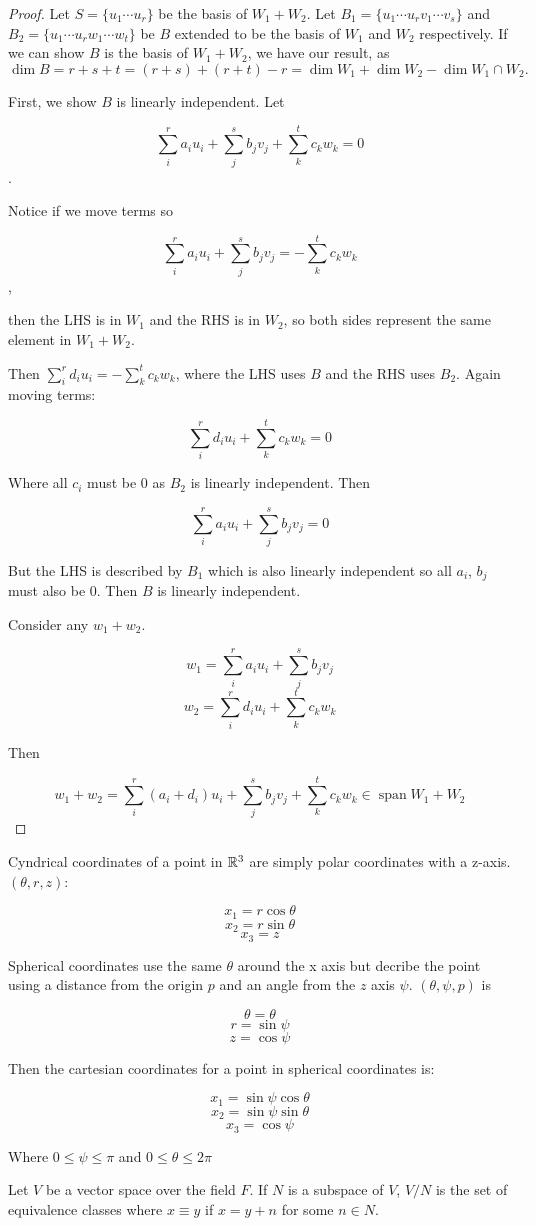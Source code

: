 \documentclass[10pt]{article}
\begin{document}
\begin{proof}
	Let $S = \{ u_1 \cdots u_r \}$ be the basis of $W_1 + W_2$. Let $B_1 = \{ u_1 \cdots u_r v_1 \cdots v_s \}$ and $B_2 = \{ u_1 \cdots u_r w_1 \cdots w_t \}$ be $B$ extended to be the basis of $W_1$ and $W_2$ respectively. 
	If we can show $B$ is the basis of $W_1 + W_2$, we have our result, as $\dim B = r + s + t = (r + s) + (r + t) - r = \dim W_1 + \dim W_2 - \dim W_1 \cap W_2.$

	First, we show $B$ is linearly independent. Let 

	\[\sum_i^r{a_iu_i} + \sum_j^s{b_jv_j} + \sum_k^t{c_kw_k} = 0\]. 

	Notice if we move terms so 

	\[\sum_i^r{a_iu_i} + \sum_j^s{b_jv_j} = -\sum_k^t{c_kw_k}\], 

	then the LHS is in $W_1$ and the RHS is in $W_2$, so both sides represent the same element in $W_1 + W_2$. 

	Then $\sum_i^r{d_iu_i} = -\sum_k^t{c_kw_k}$, where the LHS uses $B$ and the RHS uses $B_2$. Again moving terms:

	\[\sum_i^r{d_iu_i} + \sum_k^t{c_kw_k} = 0\]

	Where all $c_i$ must be 0 as $B_2$ is linearly independent. Then

	\[\sum_i^r{a_iu_i} + \sum_j^s{b_jv_j} = 0\]

	But the LHS is described by $B_1$ which is also linearly independent so all $a_i$, $b_j$ must also be 0. Then $B$ is linearly independent.

	Consider any $w_1 + w_2$. 

	\[w_1 = \sum_i^r{a_iu_i} + \sum_j^s{b_jv_j}\]
	\[w_2 = \sum_i^r{d_iu_i} + \sum_k^t{c_kw_k}\]

	Then

	\[w_1 + w_2 = \sum_i^r{(a_i + d_i) u_i} + \sum_j^s{b_jv_j} + \sum_k^t{c_kw_k} \in \operatorname{span} W_1 + W_2 \]

\end{proof}

\begin{note}

	Cyndrical coordinates of a point in $\mathbb{R}^3$ are simply polar coordinates with
	a z-axis. $(\theta, r, z)$:

	\[ x_1 = r \cos \theta \]
	\[ x_2 = r \sin \theta \]
	\[ x_3 = z \]

	Spherical coordinates use the same $\theta$ around the x axis but decribe the
	point using a distance from the origin $p$ and an angle from the $z$ axis
	$\psi$. $(\theta, \psi, p)$ is 

	\[\theta = \theta \]
	\[r = \sin \psi \]
	\[z = \cos \psi \]

	Then the cartesian coordinates for a point in spherical coordinates is:

	\[x_1 = \sin \psi \cos \theta \]
	\[x_2 = \sin \psi \sin \theta \]
	\[x_3 = \cos \psi \]

	Where $0 \leq \psi \leq \pi$ and $0 \leq \theta \leq 2\pi$

\end{note}

\begin{note}
	Let $V$ be a vector space over the field $F$. If $N$ is a subspace of $V$, $V
	/ N$ is the set of equivalence classes where $x \equiv y$ if $x = y + n$ for
	some $n \in N$.
\end{note}
	
\end{document}
